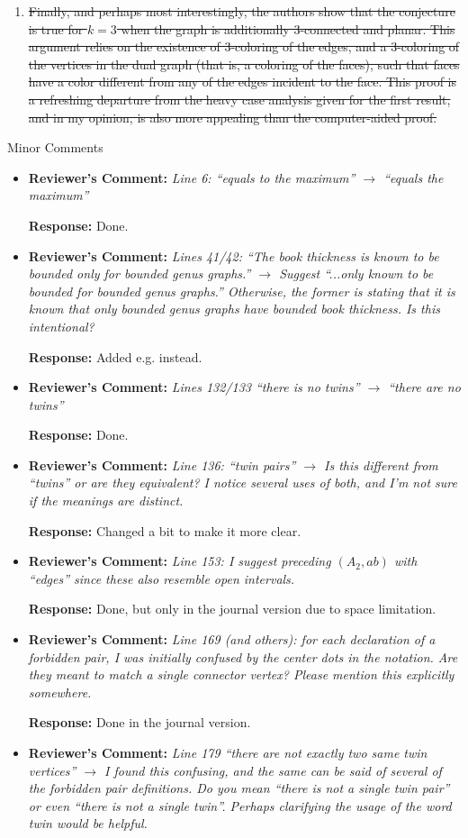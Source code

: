 \documentclass{article}
\newcommand{\rcomment}[1]{\vspace{0.3cm} \item \textbf{Reviewer's Comment:} {\em #1}}
\newcommand{\response}{\vspace{0.2cm} \textbf{Response: }}
\begin{document}
\begin{itemize}
{\begin{enumerate}
\item \st{Finally, and perhaps most interestingly, the authors show that the conjecture is true for $k=3$ when the graph is additionally 3-connected and planar. This argument relies on the existence of 3-coloring of the edges, and  a 3-coloring of the vertices in the dual graph (that is, a coloring of the faces), such that faces have a color different from any of the edges incident to the face. This proof is a refreshing departure from the heavy case analysis given for the first result, and in my opinion, is also more appealing than the computer-aided proof.}
\end{enumerate}


Minor Comments

\begin{itemize}
\rcomment{Line 6: ``equals to the maximum'' $\rightarrow$ ``equals the maximum''}

\response{Done.}

\rcomment{Lines 41/42: ``The book thickness is known to be bounded only for bounded genus graphs.'' $\rightarrow$ Suggest ``...only known to be bounded for bounded genus graphs.'' Otherwise, the former is stating that it is known that only bounded genus graphs have bounded book thickness. Is this intentional?}

\response{Added e.g. instead.}

\rcomment{Lines 132/133 ``there is no twins'' $\rightarrow$ ``there are no twins''}

\response{Done.}

\rcomment{Line 136: ``twin pairs'' $\rightarrow$ Is this different from ``twins'' or are they equivalent? I notice several uses of both, and I’m not sure if the meanings are distinct.}

\response{Changed a bit to make it more clear.}

\rcomment{Line 153: I suggest preceding $(A_2,ab)$ with ``edges'' since these also resemble open intervals.}

\response{Done, but only in the journal version due to space limitation.}

\rcomment{Line 169 (and others): for each declaration of a forbidden pair, I was initially confused by the center dots in the notation. Are they meant to match a single connector vertex? Please mention this explicitly somewhere.}

\response{Done in the journal version.}

\rcomment{Line 179 ``there are not exactly two same twin vertices'' $\rightarrow$ I found this confusing, and the same can be said of several of the forbidden pair definitions. Do you mean ``there is not a single twin pair'' or even ``there is not a single twin''. Perhaps clarifying the usage of the word twin would be helpful.}


\end{itemize}}
\end{itemize}
\end{document}
